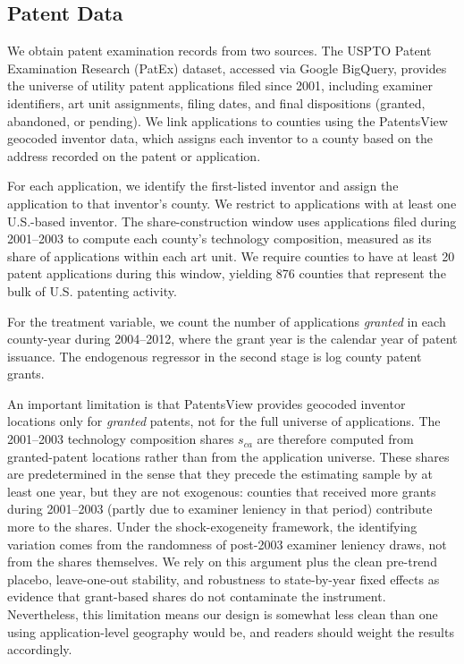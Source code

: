 \documentclass[12pt]{article}
\begin{document}
\subsection{Patent Data}

We obtain patent examination records from two sources. The USPTO Patent Examination Research (PatEx) dataset, accessed via Google BigQuery, provides the universe of utility patent applications filed since 2001, including examiner identifiers, art unit assignments, filing dates, and final dispositions (granted, abandoned, or pending). We link applications to counties using the PatentsView geocoded inventor data, which assigns each inventor to a county based on the address recorded on the patent or application.

For each application, we identify the first-listed inventor and assign the application to that inventor's county. We restrict to applications with at least one U.S.-based inventor. The share-construction window uses applications filed during 2001--2003 to compute each county's technology composition, measured as its share of applications within each art unit. We require counties to have at least 20 patent applications during this window, yielding 876 counties that represent the bulk of U.S. patenting activity.

For the treatment variable, we count the number of applications \textit{granted} in each county-year during 2004--2012, where the grant year is the calendar year of patent issuance. The endogenous regressor in the second stage is log county patent grants.

An important limitation is that PatentsView provides geocoded inventor locations only for \textit{granted} patents, not for the full universe of applications. The 2001--2003 technology composition shares $s_{ca}$ are therefore computed from granted-patent locations rather than from the application universe. These shares are predetermined in the sense that they precede the estimating sample by at least one year, but they are not exogenous: counties that received more grants during 2001--2003 (partly due to examiner leniency in that period) contribute more to the shares. Under the \citet{borusyak2022shift} shock-exogeneity framework, the identifying variation comes from the randomness of post-2003 examiner leniency draws, not from the shares themselves. We rely on this argument plus the clean pre-trend placebo, leave-one-out stability, and robustness to state-by-year fixed effects as evidence that grant-based shares do not contaminate the instrument. Nevertheless, this limitation means our design is somewhat less clean than one using application-level geography would be, and readers should weight the results accordingly.
\end{document}
